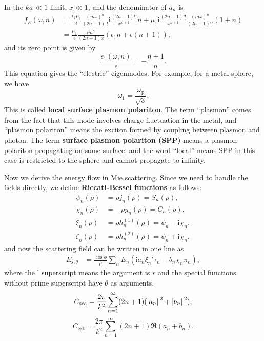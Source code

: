 \documentclass[hyperref, a4paper]{article}
\newcommand*{\ii}{\mathrm{i}}
\newcommand*{\concept}[1]{{\textbf{#1}}}
\begin{document}
In the $ka \ll 1$ limit, $x \ll 1$, and the denominator of $a_n$ is 
\begin{equation}
    \begin{aligned}
        f_E(\omega, n) &= \frac{\epsilon_1 \mu_1}{\epsilon} \frac{(mx)^n}{(2n+1) !!} \ii \frac{(2n-1)!!}{x^{n+1}} n
        + \mu_1 \ii \frac{(2n-1)!!}{x^{n+1}} \frac{(mx)^n}{(2n+1)!!} (1+n) \\
        &= \frac{\mu_1}{\epsilon} \frac{\ii m^n}{(2n+1) x} (\epsilon_1 n + \epsilon (n+1)),
    \end{aligned}
\end{equation}
and its zero point is given by 
\begin{equation}
    \frac{\epsilon_1(\omega, n)}{\epsilon} = - \frac{n+1}{n}.
\end{equation}
This equation gives the ``electric'' eigenmodes. For example, for a metal sphere, we have 
\begin{equation}
    \omega_1 = \frac{\omega_\text{p}}{\sqrt{3}}. 
\end{equation}
This is called \concept{local surface plasmon polariton}. The term ``plasmon'' comes from the fact that 
this mode involves charge fluctuation in the metal, and ``plasmon polariton'' means the exciton formed by 
coupling between plasmon and photon. The term \concept{surface plasmon polariton (SPP)} means a plasmon polariton 
propagating on some surface, and the word ``local'' means SPP in this case is restricted to the sphere and 
cannot propagate to infinity.   

Now we derive the energy flow in Mie scattering. Since we need to handle the fields directly, 
we define \concept{Riccati-Bessel functions} as follows:
\begin{equation}
    \begin{aligned}
        \psi_n(\rho) &= \rho j_n(\rho) = S_n(\rho), \\
        \chi_n(\rho) &= - \rho y_n(\rho) = C_n(\rho), \\
        \xi_n(\rho) &= \rho h_n^{(1)}(\rho) = \psi_n - \ii \chi_n, \\
        \zeta_n(\rho) &= \rho h_n^{(2)}(\rho) = \psi_n + \ii \chi_n,
    \end{aligned}
\end{equation}
and now the scattering field can be written in one line as 
\begin{equation}
    \begin{aligned}
        E_{\text{s}, \theta} &= \frac{\cos \phi}{\rho} \sum_n E_n (\ii a_n \xi_n' \tau_n - b_n \chi_n \pi_n) , 
    \end{aligned}
\end{equation}
where the $^\prime$ superscript means the argument is $r$ and the special functions without prime superscript
have $\theta$ as arguments. 
\begin{equation}
    C_\text{sca} = \frac{2\pi}{k^2} \sum_{n=1}^\infty (2n+1) (\abs*{a_n}^2 + \abs*{b_n}^2),
\end{equation}
\begin{equation}
    C_\text{ext} = \frac{2\pi}{k^2} \sum_{n=1}^\infty (2n+1) \Re (a_n + b_n).
\end{equation}
\end{document}
